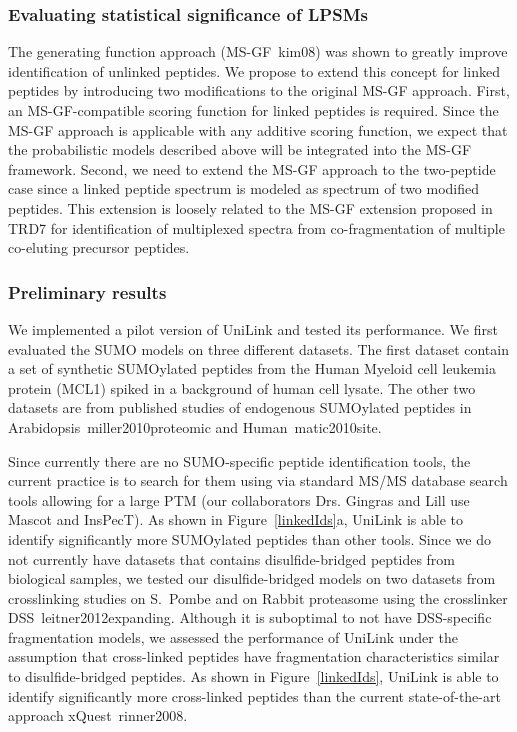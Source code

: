 \subsubsection{Evaluating statistical significance of LPSMs}



The generating function approach (MS-GF~\cite{unv}{kim08}) 
 was shown to greatly improve identification of unlinked peptides.  We propose to extend this concept for linked peptides by introducing two modifications to the original MS-GF approach. First, an MS-GF-compatible scoring function for linked peptides is required. Since the MS-GF approach is applicable with any additive scoring function, we expect that the probabilistic models described above will be  integrated into the MS-GF framework.  Second, we need to extend the MS-GF approach to the two-peptide case since a linked peptide spectrum is modeled as spectrum of two modified peptides. This extension is loosely related to the MS-GF extension proposed in TRD7 for identification of multiplexed spectra from co-fragmentation of multiple co-eluting precursor peptides.


\subsubsection{Preliminary results}

We implemented a pilot version of UniLink and tested its performance. We first evaluated the SUMO models on three different datasets. The first  dataset contain a set of synthetic SUMOylated peptides from the Human Myeloid cell leukemia protein (MCL1) spiked in a background of human cell lysate. The other two datasets are from published studies of endogenous SUMOylated peptides in Arabidopsis~\cite{unv}{miller2010proteomic} and Human~\cite{unv}{matic2010site}. 

Since currently there are no SUMO-specific peptide identification tools, the current practice is to search for them using via standard MS/MS database search tools allowing for a large PTM (our collaborators Drs. Gingras and Lill use Mascot and InsPecT).  
As shown in Figure~\ref{linkedIds}a, UniLink is able to identify significantly more 
SUMOylated peptides than other tools.
  Since we do not currently have datasets that contains disulfide-bridged peptides from biological samples, we tested our disulfide-bridged models on two datasets from crosslinking studies on S.~Pombe and on Rabbit proteasome using the crosslinker DSS~\cite{unv}{leitner2012expanding}.  Although it is suboptimal to not have DSS-specific fragmentation models, we assessed the performance of UniLink under the assumption that cross-linked peptides have fragmentation characteristics similar to disulfide-bridged peptides.  As shown in Figure~\ref{linkedIds}, UniLink is able to identify significantly more cross-linked peptides than the current state-of-the-art approach xQuest~\cite{unv}{rinner2008}. %

